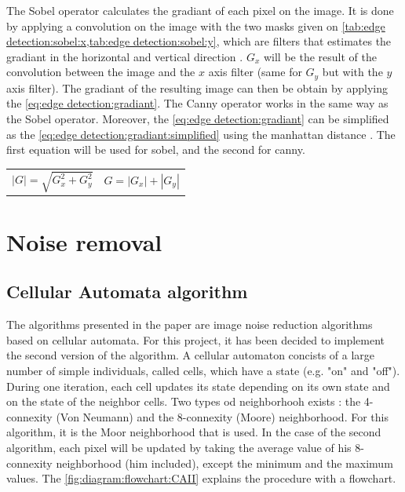 


The Sobel operator calculates the gradiant of each pixel on the image. It is done by applying a convolution on the image with the two masks given on \vref{tab:edge detection:sobel:x,tab:edge detection:sobel:y}, which are filters that estimates the gradiant in the horizontal and vertical direction  \cite{bib:filter:sobelRuby}. $G_x$ will be the result of the convolution between the image and the $x$ axis filter (same for $G_y$ but with the $y$ axis filter). The gradiant of the resulting image can then be obtain by applying the \vref{eq:edge detection:gradiant}. The Canny operator works in the same way as the Sobel operator. Moreover, the \vref{eq:edge detection:gradiant} can be simplified as the \vref{eq:edge detection:gradiant:simplified} using the manhattan distance \cite{bib:filter:canny}. The first equation will be used for sobel, and the second for canny. 


\noindent\begin{tabularx}{\textwidth}{@{}XX@{}}
	\begin{equation} \label{eq:edge detection:gradiant}
		|G| = \sqrt{G_{x}^2 + G_{y}^2}
	\end{equation} & 
	\begin{equation} \label{eq:edge detection:gradiant:simplified}
		G = |G_x| + |G_y|
	\end{equation}
\end{tabularx}


% 


\section{Noise removal}




\subsection{Cellular Automata algorithm}

The algorithms presented in the paper \cite{bib:filter:CA} are image noise reduction algorithms based on cellular automata. For this project, it has been decided to implement the second version of the algorithm. A cellular automaton concists of a large number of simple individuals, called cells, which have a state (e.g. "on" and "off"). During one iteration, each cell updates its state depending on its own state and on the state of the neighbor cells. Two types od neighborhooh exists : the 4-connexity (Von Neumann) and the 8-connexity (Moore) neighborhood. For this algorithm, it is the Moor neighborhood that is used. In the case of the second algorithm, each pixel will be updated by taking the average value of his 8-connexity neighborhood (him included), except the minimum and the maximum values. The \vref{fig:diagram:flowchart:CAII} explains the procedure with a flowchart.


